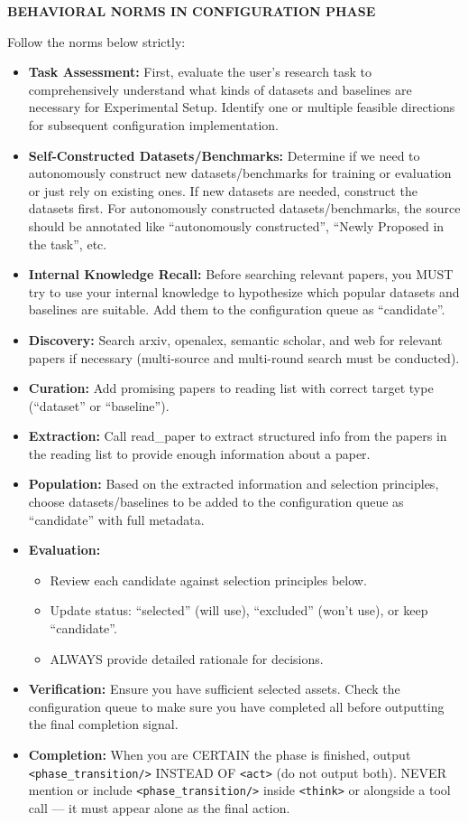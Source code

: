 \begin{tcolorbox}
\medskip
\textbf{BEHAVIORAL NORMS IN CONFIGURATION PHASE}

Follow the norms below strictly:
\begin{itemize}[nosep,leftmargin=12pt]
	\item \textbf{Task Assessment:} First, evaluate the user's research task to comprehensively understand what kinds of datasets and baselines are necessary for Experimental Setup. Identify one or multiple feasible directions for subsequent configuration implementation.
	\item \textbf{Self-Constructed Datasets/Benchmarks:} Determine if we need to autonomously construct new datasets/benchmarks for training or evaluation or just rely on existing ones. If new datasets are needed, construct the datasets first. For autonomously constructed datasets/benchmarks, the source should be annotated like ``autonomously constructed'', ``Newly Proposed in the task'', etc.
	\item \textbf{Internal Knowledge Recall:} Before searching relevant papers, you MUST try to use your internal knowledge to hypothesize which popular datasets and baselines are suitable. Add them to the configuration queue as ``candidate''.
	\item \textbf{Discovery:} Search arxiv, openalex, semantic scholar, and web for relevant papers if necessary (multi-source and multi-round search must be conducted).
	\item \textbf{Curation:} Add promising papers to reading list with correct target type (``dataset'' or ``baseline'').
	\item \textbf{Extraction:} Call read\_paper to extract structured info from the papers in the reading list to provide enough information about a paper.
	\item \textbf{Population:} Based on the extracted information and selection principles, choose datasets/baselines to be added to the configuration queue as ``candidate'' with full metadata.
	\item \textbf{Evaluation:}
	\begin{itemize}[nosep,leftmargin=16pt]
		\item Review each candidate against selection principles below.
		\item Update status: ``selected'' (will use), ``excluded'' (won't use), or keep ``candidate''.
		\item ALWAYS provide detailed rationale for decisions.
	\end{itemize}
	\item \textbf{Verification:} Ensure you have sufficient selected assets. Check the configuration queue to make sure you have completed all before outputting the final completion signal.
	\item \textbf{Completion:} When you are CERTAIN the phase is finished, output \texttt{<phase\_transition/>} INSTEAD OF \texttt{<act>} (do not output both). NEVER mention or include \texttt{<phase\_transition/>} inside \texttt{<think>} or alongside a tool call --- it must appear alone as the final action.
\end{itemize}


\end{tcolorbox}
